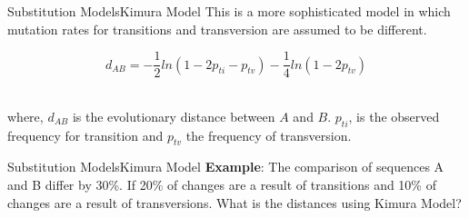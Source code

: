 \documentclass[10pt]{beamer}
\newcommand{\1}{
	\setbeamertemplate{background}{
		\texttt{[image: img/1]}
		\tikz[overlay] \fill[fill opacity=0.75,fill=white] (0,0) rectangle (-\paperwidth,\paperheight);
	}
}
\begin{document}
\begin{frame}{Substitution Models}{Kimura Model}	
	This is a more sophisticated model in which mutation rates for transitions	and transversion are assumed to be different.
	
	\begin{equation}
	d_{AB} = -\frac{1}{2} ln (1 -  2p_{ti} - p_{tv} ) - \frac{1}{4}  ln (1 - 2p_{tv} )  
	\end{equation}\\
	
	\vspace{0.5cm}
	
	where, $d_{AB}$ is the evolutionary distance between $A$ and $B$. $p_{ti}$, is the observed
	frequency for transition and $p_{tv}$ the frequency of transversion\footnotemark. \\
	
	
	
\end{frame}

\begin{frame}{Substitution Models}{Kimura Model}	
	\textbf{Example}: The comparison of	sequences A and B differ by 30\%. If 20\% of changes are a result of transitions and 10\% of changes are a result of transversions. What is the distances using Kimura Model?		
\end{frame}
\end{document}
